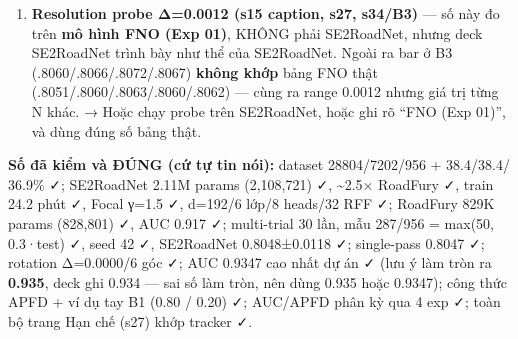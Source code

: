 \documentclass[
  11pt,
]{article}
\providecommand{\tightlist}{%
  \setlength{\itemsep}{0pt}\setlength{\parskip}{0pt}}
\begin{document}
\begin{enumerate}
  \begin{itemize}
  \tightlist
  \item
    {[}OK{]} \textbf{Greedy-diversity 0.795} --- KHỚP CHÍNH XÁC.
    Birchler et al., TOSEM 2023 ({[}2{]}): greedy search average APFD =
    \textbf{79.5\%}.
  \item
    {[}OK{]} \textbf{SO-SDC-Prioritizer 0.765} --- KHỚP CHÍNH XÁC. TOSEM
    2023: SO-SDC average APFD = \textbf{76.5\%}.
  \item
    (!) \textbf{Random 0.493} --- literature ghi \textbf{49.9\%} (TOSEM
    2023). Lệch nhẹ (0.493 vs 0.499); 0.493 là số nhóm tái lập, nói ``≈
    random \textasciitilde0.5'' là an toàn.
  \item
    {[}OK{]} \textbf{ITS4SDC (đã sửa tên 2026-06-24, trước ghi nhầm
    ``ITS4SDC'').} Güllü, Shah, Pfahl --- ICST 2025 SDC Tool Competition
    (arXiv:2501.03881). Là \textbf{bi-LSTM} (220 cells) trên 2 đặc trưng
    chuỗi (góc đoạn + chiều dài), test SELECTION, paper công bố
    \textbf{F1=0.89} --- \textbf{KHÔNG có APFD}. → APFD 0.781 + bảng
    xoay Δ=0.057 là \textbf{nhóm tái lập}, không phải số trong paper.
    Slide đã sửa: tên ITS4SDC + method LSTM (bỏ ``MLP 3 đặc trưng'').
    Còn lại: drift Δ=0.057 cần log tái lập (xem (!) 3) + sửa nhãn
    ``ICST'25'' → ref riêng cho ITS4SDC (hiện refs deck chưa có entry
    ITS4SDC --- nên thêm).
  \item
    (!) \textbf{GNN 0.533, ResNet-50 0.572, LLM zero-shot 0.487} ---
    không có nguồn công bố; là baseline nhóm tái lập trong harness. Cần
    sẵn log để chứng minh.
  \end{itemize}
\item
  \textbf{Resolution probe Δ=0.0012 (s15 caption, s27, s34/B3)} --- số
  này đo trên \textbf{mô hình FNO (Exp 01)}, KHÔNG phải SE2RoadNet,
  nhưng deck SE2RoadNet trình bày như thể của SE2RoadNet. Ngoài ra bar ở
  B3 (.8060/.8066/.8072/.8067) \textbf{không khớp} bảng FNO thật
  (.8051/.8060/.8063/.8060/.8062) --- cùng ra range 0.0012 nhưng giá trị
  từng N khác. → Hoặc chạy probe trên SE2RoadNet, hoặc ghi rõ ``FNO (Exp
  01)'', và dùng đúng số bảng thật.
\end{enumerate}

\textbf{Số đã kiểm và ĐÚNG (cứ tự tin nói):} dataset 28804/7202/956 +
38.4/38.4/ 36.9\% ✓; SE2RoadNet 2.11M params (2,108,721) ✓,
\textasciitilde2.5× RoadFury ✓, train 24.2 phút ✓, Focal γ=1.5 ✓,
d=192/6 lớp/8 heads/32 RFF ✓; RoadFury 829K params (828,801) ✓, AUC
0.917 ✓; multi-trial 30 lần, mẫu 287/956 = max(50,
0.3·\textbar test\textbar) ✓, seed 42 ✓, SE2RoadNet 0.8048±0.0118 ✓;
single-pass 0.8047 ✓; rotation Δ=0.0000/6 góc ✓; AUC 0.9347 cao nhất dự
án ✓ (lưu ý làm tròn ra \textbf{0.935}, deck ghi 0.934 --- sai số làm
tròn, nên dùng 0.935 hoặc 0.9347); công thức APFD + ví dụ tay B1 (0.80 /
0.20) ✓; AUC/APFD phân kỳ qua 4 exp ✓; toàn bộ trang Hạn chế (s27) khớp
tracker ✓.
\end{document}
